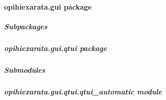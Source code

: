 \documentclass[letterpaper,11pt,english]{sphinxmanual}
\begin{document}
\sphinxstepscope


\paragraph{opihiexarata.gui package}
\label{\detokenize{code/opihiexarata.gui:opihiexarata-gui-package}}\label{\detokenize{code/opihiexarata.gui::doc}}

\subparagraph{Subpackages}
\label{\detokenize{code/opihiexarata.gui:subpackages}}
\sphinxstepscope


\subparagraph{opihiexarata.gui.qtui package}
\label{\detokenize{code/opihiexarata.gui.qtui:opihiexarata-gui-qtui-package}}\label{\detokenize{code/opihiexarata.gui.qtui::doc}}

\subparagraph{Submodules}
\label{\detokenize{code/opihiexarata.gui.qtui:submodules}}
\sphinxstepscope


\subparagraph{opihiexarata.gui.qtui.qtui\_automatic module}
\label{\detokenize{code/opihiexarata.gui.qtui.qtui_automatic:module-opihiexarata.gui.qtui.qtui_automatic}}\label{\detokenize{code/opihiexarata.gui.qtui.qtui_automatic:opihiexarata-gui-qtui-qtui-automatic-module}}\label{\detokenize{code/opihiexarata.gui.qtui.qtui_automatic::doc}}
\end{document}
